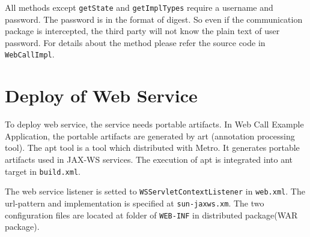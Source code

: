 All methods except \texttt{getState} and \texttt{getImplTypes} require a username and password. The password is in the format of digest. So even if the communication package is intercepted, the third party will not know the plain text of user password.
For details about the method please refer the source code in \texttt{WebCallImpl}.

\section{Deploy of Web Service}

To deploy web service, the service needs portable artifacts. In Web Call Example Application, the portable artifacts are generated by \textsf{art} (annotation processing tool). The \textsf{apt} tool is a tool which distributed with \textsf{Metro}. It generates portable artifacts used in JAX-WS services.\cite{aptHomepage} The execution of apt is integrated into ant target in \texttt{build.xml}. 

The web service listener is setted to \texttt{WSServletContextListener} in \texttt{web.xml}. The url-pattern and implementation is specified at \texttt{sun-jaxws.xm}. The two configuration files are located at folder of \texttt{WEB-INF} in distributed package(WAR package). 



